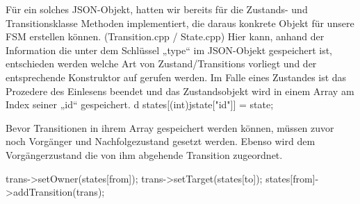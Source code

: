 Für ein solches JSON-Objekt, hatten wir bereits für die Zustands- und
Transitionsklasse Methoden implementiert, die daraus konkrete Objekt für unsere
FSM erstellen können. (Transition.cpp / State.cpp)
Hier kann, anhand der Information die unter dem Schlüssel „type“ im JSON-Objekt
gespeichert ist, entschieden werden welche Art von Zustand/Transitions vorliegt
und der entsprechende Konstruktor auf gerufen werden.
Im Falle eines Zustandes ist das Prozedere des Einlesens beendet und das
Zustandsobjekt wird in einem Array am Index seiner „id“ gespeichert.
d
states[(int)jstate["id"]] = state;

Bevor Transitionen in ihrem Array gespeichert werden können, müssen zuvor noch
Vorgänger und Nachfolgezustand gesetzt werden. Ebenso wird dem Vorgängerzustand
die von ihm abgehende Transition zugeordnet.

trans->setOwner(states[from]);
trans->setTarget(states[to]);
states[from]->addTransition(trans);